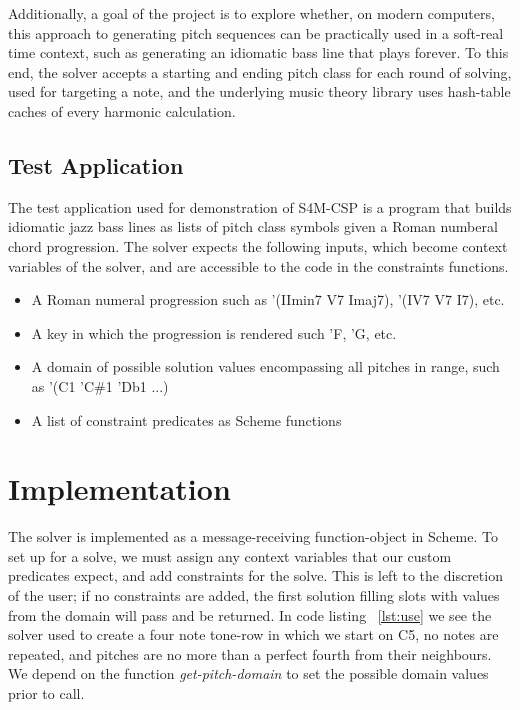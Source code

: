 \documentclass[pmlr]{jmlr}%
\begin{document}
Additionally, a goal of the project is to explore whether, on modern computers, this approach
to generating pitch sequences can be practically used in a soft-real time context, such as
generating an idiomatic bass line that plays forever. To this end,
the solver accepts a starting and ending pitch class for each round of solving, used 
for targeting a note, and the underlying music theory library uses hash-table caches
of every harmonic calculation. 


\subsection{Test Application}
The test application used for demonstration of S4M-CSP is a program that builds idiomatic jazz bass lines
as lists of pitch class symbols given a Roman numberal chord progression. 
The solver expects the following inputs, which become context variables of the solver, and
are accessible to the code in the constraints functions. 

\begin{itemize}
  \item A Roman numeral progression such as '(IImin7 V7 Imaj7), '(IV7 V7 I7), etc.
  \item A key in which the progression is rendered such 'F, 'G, etc.
  \item A domain of possible solution values encompassing all pitches in range, such as '(C1 'C\#1 'Db1 ...)
  \item A list of constraint predicates as Scheme functions
\end{itemize}


\section{Implementation}

The solver is implemented as a message-receiving function-object in Scheme.
To set up for a solve, we must assign any context variables that our
custom predicates expect, and add constraints for the solve. 
This is left to the discretion of the user; if no constraints are added,
the first solution filling slots with values from the domain will pass and be returned.
In code listing ~\ref{lst:use} we see the solver used to create a four note tone-row
in which we start on C5, no notes are repeated, and pitches are no more than a perfect fourth from their neighbours.
We depend on the function {\it get-pitch-domain} to set the possible
domain values prior to call.
\end{document}
